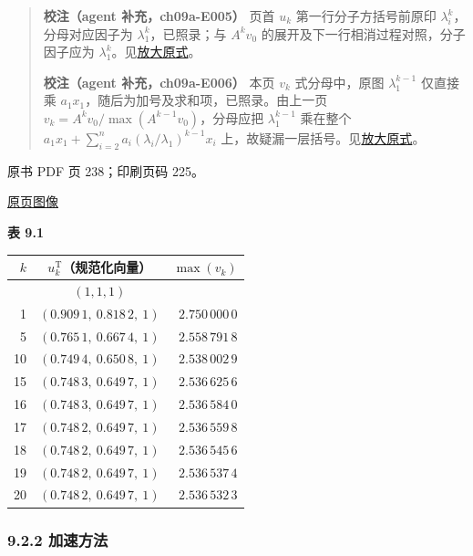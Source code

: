 \begin{quote}
\textbf{校注（agent 补充，ch09a-E005）} 页首 \(u_k\) 第一行分子方括号前原印 \(\lambda_i^k\)，分母对应因子为 \(\lambda_1^k\)，已照录；与 \(A^kv_0\) 的展开及下一行相消过程对照，分子因子应为 \(\lambda_1^k\)。见\href{verified/assets/ch09a/review-p237-u-k-numerator.png}{放大原式}。

\textbf{校注（agent 补充，ch09a-E006）} 本页 \(v_k\) 式分母中，原图 \(\lambda_1^{k-1}\) 仅直接乘 \(a_1x_1\)，随后为加号及求和项，已照录。由上一页 \(v_k=A^kv_0/\max(A^{k-1}v_0)\)，分母应把 \(\lambda_1^{k-1}\) 乘在整个 \(a_1x_1+\sum_{i=2}^na_i(\lambda_i/\lambda_1)^{k-1}x_i\) 上，故疑漏一层括号。见\href{verified/assets/ch09a/review-p237-v-k-denominator.png}{放大原式}。
\end{quote}

\clearpage

原书 PDF 页 238；印刷页码 225。

\href{source-images/pdf-238.jpeg}{原页图像}

\textbf{表 9.1}

{\def\LTcaptype{none} %
\begin{longtable}[]{@{}rcr@{}}
\toprule\noalign{}
\(k\) & \(u_k^{\mathrm T}\)（规范化向量） & \(\max(v_k)\) \\
\midrule\noalign{}
\endhead
\bottomrule\noalign{}
\endlastfoot
0 & \((1,1,1)\) & \\
1 & \((0.909\,1,\ 0.818\,2,\ 1)\) & \(2.750\,000\,0\) \\
5 & \((0.765\,1,\ 0.667\,4,\ 1)\) & \(2.558\,791\,8\) \\
10 & \((0.749\,4,\ 0.650\,8,\ 1)\) & \(2.538\,002\,9\) \\
15 & \((0.748\,3,\ 0.649\,7,\ 1)\) & \(2.536\,625\,6\) \\
16 & \((0.748\,3,\ 0.649\,7,\ 1)\) & \(2.536\,584\,0\) \\
17 & \((0.748\,2,\ 0.649\,7,\ 1)\) & \(2.536\,559\,8\) \\
18 & \((0.748\,2,\ 0.649\,7,\ 1)\) & \(2.536\,545\,6\) \\
19 & \((0.748\,2,\ 0.649\,7,\ 1)\) & \(2.536\,537\,4\) \\
20 & \((0.748\,2,\ 0.649\,7,\ 1)\) & \(2.536\,532\,3\) \\
\end{longtable}
}

\subsubsection{9.2.2 加速方法}\label{ch09a-ux52a0ux901fux65b9ux6cd5}

